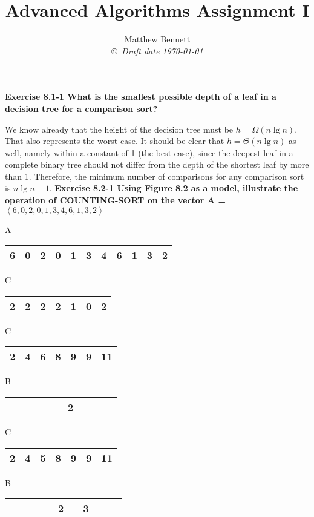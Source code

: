 \documentclass[10pt,fullpage]{article}
\title{ Advanced Algorithms Assignment I }
\author{Matthew Bennett \\
{\small\em \copyright \  Draft date \today }}
\date{ }
\begin{document}
\maketitle

\textbf{Exercise 8.1-1 What is the smallest possible depth of a
leaf in a decision tree for a comparison sort?}

We know already that the height of the decision tree must be $h =
 \Omega(n \lg n)$. That also represents the worst-case. It should be
 clear that $h = \Theta(n \lg n)$ as well, namely within a constant
of 1 (the best case), since the deepest leaf in a complete binary
tree should not differ from the depth of the shortest leaf by more
than 1. Therefore, the minimum number of comparisons for any
comparison sort is $n \lg n - 1$.
\newpage
\textbf{Exercise 8.2-1 Using Figure 8.2 as a model, illustrate the
operation of COUNTING-SORT on the vector A = $\left< 6, 0, 2, 0,
1, 3, 4, 6, 1, 3, 2 \right> $}

A \begin{tabular}{|c|c|c|c|c|c|c|c|c|c|c|}
  \hline
  6 & 0 & 2 & 0 & 1 & 3 & 4 & 6 & 1 & 3 & 2 \\
  \hline
\end{tabular}

C \begin{tabular}{|c|c|c|c|c|c|c|}
  \hline
  2 & 2 & 2 & 2 & 1 & 0 & 2 \\
  \hline
\end{tabular}

C \begin{tabular}{|c|c|c|c|c|c|c|}
  \hline
  2 & 4 & 6 & 8 & 9 & 9 & 11 \\
  \hline
\end{tabular}

B \begin{tabular}{|c|c|c|c|c|c|c|c|c|c|c|}
  \hline
  &   &   &   &   &   & 2 &   &   &   &   \\
  \hline
\end{tabular}

C \begin{tabular}{|c|c|c|c|c|c|c|}
  \hline
  2 & 4 & 5 & 8 & 9 & 9 & 11 \\
  \hline
\end{tabular}

B \begin{tabular}{|c|c|c|c|c|c|c|c|c|c|c|}
  \hline
  &   &   &   &   & 2 &   & 3 &  & &   \\
  \hline
\end{tabular}
\end{document}
